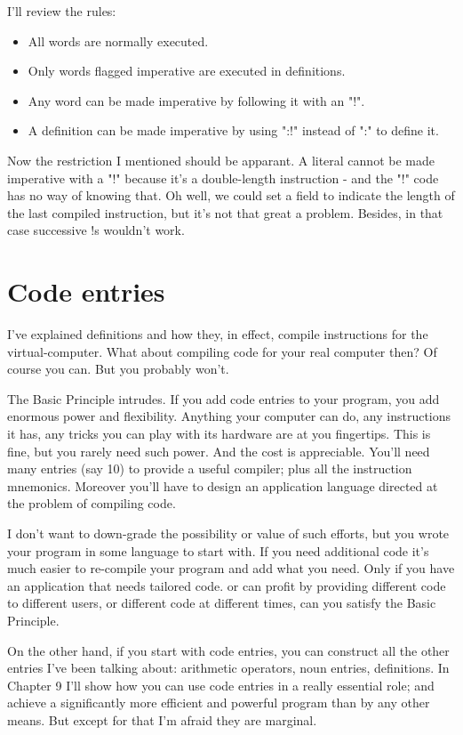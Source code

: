 \documentclass[b5paper, oneside]{book}
\begin{document}
I'll review the rules:\begin{itemize}
   \item All words are normally executed.
   \item Only words flagged imperative are executed in definitions.
   \item Any word can be made imperative by following it with an "!".
   \item A definition can be made imperative by using ":!" instead of ":" to define it.\end{itemize}
Now the restriction I mentioned should be apparant. A literal cannot be made imperative with a "!" because it's a double-length instruction - and the "!" code has no way of knowing that. Oh well, we could set a field to indicate the length of the last compiled instruction, but it's not that great a problem. Besides, in that case successive !s wouldn't work.

\section{Code entries}
I've explained definitions and how they, in effect, compile instructions for the virtual-computer. What about compiling code for your real computer then? Of course you can. But you probably won't.

The Basic Principle intrudes. If you add code entries to your program, you add enormous power and flexibility. Anything your computer can do, any instructions it has, any tricks you can play with its hardware are at you fingertips. This is fine, but you rarely need such power. And the cost is appreciable. You'll need many entries (say 10) to provide a useful compiler; plus all the instruction mnemonics. Moreover you'll have to design an application language directed at the problem of compiling code.

I don't want to down-grade the possibility or value of such efforts, but you wrote your program in some language to start with. If you need additional code it's much easier to re-compile your program and add what you need. Only if you have an application that needs tailored code. or can profit by providing different code to different users, or different code at different times, can you satisfy the Basic Principle.

On the other hand, if you start with code entries, you can construct all the other entries I've been talking about: arithmetic operators, noun entries, definitions. In Chapter 9 I'll show how you can use code entries in a really essential role; and achieve a significantly more efficient and powerful program than by any other means. But except for that I'm afraid they are marginal.
\end{document}
